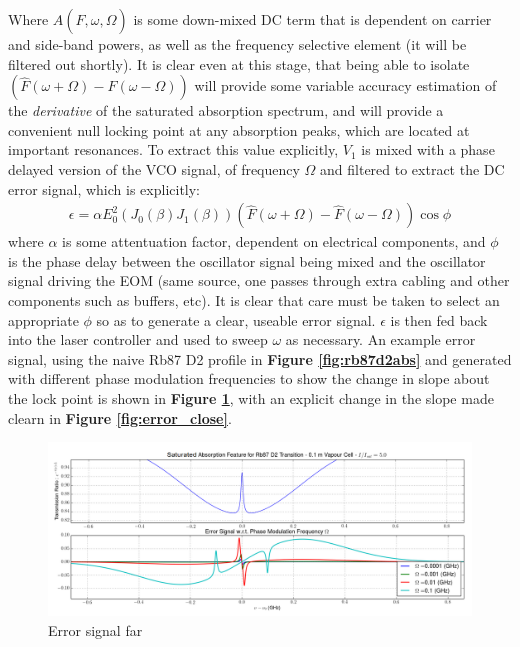 Where  $A(\hat{F}, \omega, \Omega)$ is some down-mixed DC term that is dependent
on carrier and side-band powers, as well as the frequency selective element
(it will be filtered out shortly). It is clear even at this stage, that being
able to isolate $(\hat{F}(\omega + \Omega) - \hat{F}(\omega - \Omega))$ will
provide some variable accuracy estimation of the \emph{derivative} of the
saturated absorption spectrum, and will provide a convenient null locking point
at any absorption peaks, which are located at important resonances. To extract
this value explicitly, $V_1$ is mixed with a phase delayed version of the
VCO signal, of frequency $\Omega$ and filtered to extract the DC error signal,
which is explicitly:
\begin{gather}
  \epsilon = \alpha E_0^2 (J_0(\beta)J_1(\beta))
    (\hat{F}(\omega + \Omega) - \hat{F}(\omega - \Omega))\cos\phi
\end{gather}
where $\alpha$ is some attentuation factor, dependent on electrical components,
and $\phi$ is the phase delay between the oscillator signal being mixed
and the oscillator signal driving the EOM (same source, one passes through
extra cabling and other components such as buffers, etc). It is clear that
care must be taken to select an appropriate $\phi$ so as to generate a
clear, useable error signal. $\epsilon$ is then fed back into the
laser controller and used to sweep $\omega$ as necessary.
An example error signal, using the naive Rb87 D2 profile in
\textbf{Figure \ref{fig:rb87d2abs}} and generated with different phase modulation
frequencies to show the change in slope about the lock point is shown in
\textbf{Figure \ref{fig:error_far}}, with an explicit change in the slope
made clearn in \textbf{Figure \ref{fig:error_close}}.

\begin{figure}
  \centering
  \includegraphics[height=0.5\linewidth, width=\linewidth]
    {rb_D2_error_faraway.png}
  \caption{Error signal far}
    \label{fig:error_far}
\end{figure}

